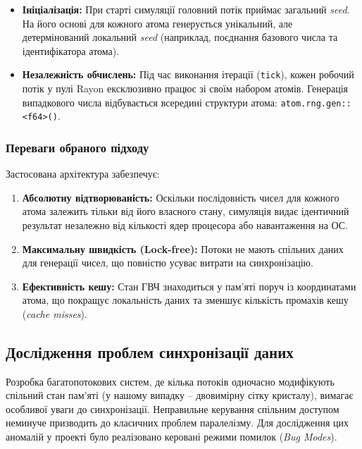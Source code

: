 \documentclass[14pt, a4paper]{extreport}
\begin{document}
	\begin{itemize}
		\item \textbf{Ініціалізація:} При старті симуляції головний потік приймає загальний \textit{seed}. На його основі для кожного атома генерується унікальний, але детермінований локальний \textit{seed} (наприклад, поєднання базового числа та ідентифікатора атома).
		\item \textbf{Незалежність обчислень:} Під час виконання ітерації (\texttt{tick}), кожен робочий потік у пулі Rayon ексклюзивно працює зі своїм набором атомів. Генерація випадкового числа відбувається всередині структури атома: \texttt{atom.rng.gen::<f64>()}.
	\end{itemize}
	
	\subsubsection{Переваги обраного підходу}
	
	Застосована архітектура забезпечує:
	
	\begin{enumerate}
		\item \textbf{Абсолютну відтворюваність:} Оскільки послідовність чисел для кожного атома залежить тільки від його власного стану, симуляція видає ідентичний результат незалежно від кількості ядер процесора або навантаження на ОС.
		\item \textbf{Максимальну швидкість (Lock-free):} Потоки не мають спільних даних для генерації чисел, що повністю усуває витрати на синхронізацію.
		\item \textbf{Ефективність кешу:} Стан ГВЧ знаходиться у пам'яті поруч із координатами атома, що покращує локальність даних та зменшує кількість промахів кешу (\textit{cache misses}).
	\end{enumerate}
	
	\subsection{Дослідження проблем синхронізації даних}
	
	Розробка багатопотокових систем, де кілька потоків одночасно модифікують спільний стан пам'яті (у нашому випадку -- двовимірну сітку кристалу), вимагає особливої уваги до синхронізації. Неправильне керування спільним доступом неминуче призводить до класичних проблем паралелізму. Для дослідження цих аномалій у проекті було реалізовано керовані режими помилок (\textit{Bug Modes}).
	
\end{document}
